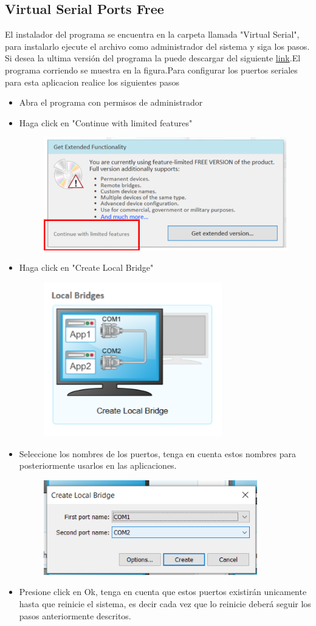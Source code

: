 \documentclass[letterpaper,12pt]{article}
\begin{document}
	\subsection{Virtual Serial Ports Free}
	El instalador del programa se encuentra en la carpeta llamada "Virtual Serial", para instalarlo ejecute el archivo como administrador del sistema y siga los pasos. Si desea la ultima versión del programa la puede descargar del siguiente \href{https://freevirtualserialports.com/}{link}.El programa corriendo se muestra en la figura.Para configurar los puertos seriales para esta aplicacion realice los siguientes pasos
	\begin{itemize}
		\item Abra el programa con permisos de administrador
		\item Haga click en "Continue with limited features"
		\begin{figure}[H]
			\centering
			\includegraphics[width=0.\linewidth]{images/virtual1}
			\label{fig:virtual1}
		\end{figure}
		
		\item Haga click en "Create Local Bridge"
		\begin{figure}[H]
			\centering
			\includegraphics[width=0.5\linewidth]{images/virtual2}
			\label{fig:virtual2}
		\end{figure}
		\item Seleccione los nombres de los puertos, tenga en cuenta estos nombres para posteriormente usarlos en las aplicaciones.
		\begin{figure}[H]
			\centering
			\includegraphics[width=0.5\linewidth]{images/virtual3}
			\caption{}
			\label{fig:virtual3}
		\end{figure}
	\item Presione click en Ok, tenga en cuenta que estos puertos existirán unicamente hasta que reinicie el sistema, es decir cada vez que lo reinicie deberá seguir los pasos anteriormente descritos.
	\end{itemize}
\end{document}
